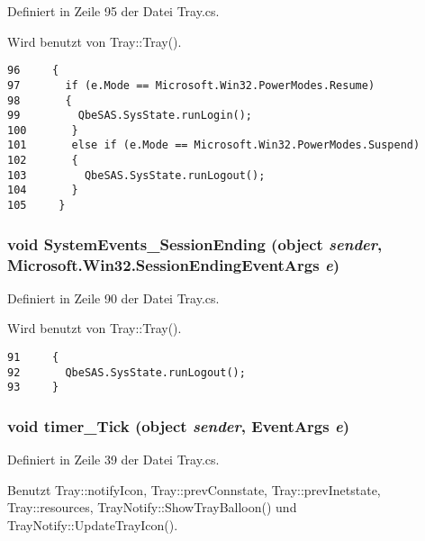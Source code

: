 Definiert in Zeile 95 der Datei Tray.cs.

Wird benutzt von Tray::Tray().



\footnotesize\begin{verbatim}96     {
97       if (e.Mode == Microsoft.Win32.PowerModes.Resume) 
98       { 
99         QbeSAS.SysState.runLogin();
100       }
101       else if (e.Mode == Microsoft.Win32.PowerModes.Suspend)
102       {
103         QbeSAS.SysState.runLogout();
104       }
105     }
\end{verbatim}\normalsize 
\hypertarget{classQbeTray_1_1Tray_QbeTray_1_1Trayd1}{
\subsubsection[SystemEvents\_\-SessionEnding]{\setlength{\rightskip}{0pt plus 5cm}void System\-Events\_\-Session\-Ending (object {\em sender}, Microsoft.Win32.Session\-Ending\-Event\-Args {\em e})}}
\label{classQbeTray_1_1Tray_QbeTray_1_1Trayd1}




Definiert in Zeile 90 der Datei Tray.cs.

Wird benutzt von Tray::Tray().



\footnotesize\begin{verbatim}91     {
92       QbeSAS.SysState.runLogout();
93     }
\end{verbatim}\normalsize 
\hypertarget{classQbeTray_1_1Tray_QbeTray_1_1Trayd0}{
\subsubsection[timer\_\-Tick]{\setlength{\rightskip}{0pt plus 5cm}void timer\_\-Tick (object {\em sender}, Event\-Args {\em e})}}
\label{classQbeTray_1_1Tray_QbeTray_1_1Trayd0}




Definiert in Zeile 39 der Datei Tray.cs.

Benutzt Tray::notify\-Icon, Tray::prev\-Connstate, Tray::prev\-Inetstate, Tray::resources, Tray\-Notify::Show\-Tray\-Balloon() und Tray\-Notify::Update\-Tray\-Icon().

